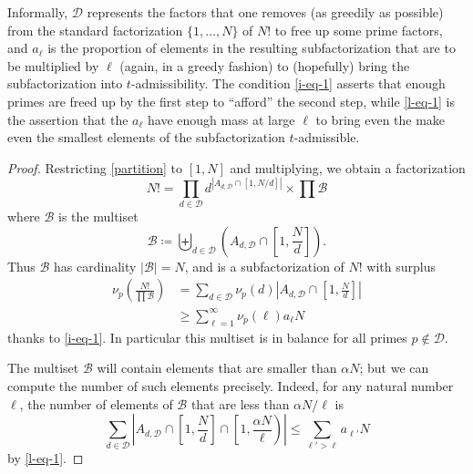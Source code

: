 \documentclass[12pt,a4paper,reqno]{amsart}
\numberwithin{equation}{section}
\theoremstyle{plain}
\theoremstyle{definition}
\newcommand\tuple{{\mathcal B}}
\begin{document}
  Informally, ${\mathcal D}$ represents the factors that one removes (as greedily as possible) from the standard factorization $\{1,\dots,N\}$ of $N!$ to free up some prime factors, and $a_\ell$ is the proportion of elements in the resulting subfactorization that are to be multiplied by $\ell$ (again, in a greedy fashion) to (hopefully) bring the subfactorization into $t$-admissibility.  The condition \eqref{i-eq-1} asserts that enough primes are freed up by the first step to ``afford'' the second step, while \eqref{l-eq-1} is the assertion that the $a_\ell$ have enough mass at large $\ell$ to bring even the make even the smallest elements of the subfactorization $t$-admissible.

  \begin{proof}  Restricting \eqref{partition} to $[1,N]$ and multiplying, we obtain a factorization
  $$ N! = \prod_{d \in {\mathcal D}} d^{|A_{d,{\mathcal D}} \cap [1,N/d]|} \times \prod \tuple$$
  where $\tuple$ is the multiset
  $$ \tuple \coloneqq \biguplus_{d \in {\mathcal D}} \left(A_{d,{\mathcal D}} \cap \left[1,\frac{N}{d}\right]\right).$$
  Thus $\tuple$ has cardinality $|\tuple| = N$, and is a subfactorization of $N!$ with surplus
  \begin{equation}\label{p-surplus-1}
  \begin{split}
   \nu_p\left( \frac{N!}{\prod \tuple} \right) &= \sum_{d \in {\mathcal D}} \nu_p(d) \left|A_{d,{\mathcal D}} \cap \left[1,\frac{N}{d}\right]\right| \\
   &\geq      \sum_{\ell=1}^\infty \nu_p(\ell) a_\ell N
  \end{split}
  \end{equation}
  thanks to \eqref{i-eq-1}.  In particular this multiset is in balance for all primes $p \not \in {\mathcal D}$. 
  
  The multiset $\tuple$ will contain elements that are smaller than $\alpha N$; but we can compute the number of such elements  precisely.  Indeed, for any natural number $\ell$, the number of elements of $\tuple$ that are less than $\alpha N/\ell$ is
  \begin{equation}\label{N-sum-1}
    \sum_{d \in {\mathcal D}} \left|A_{d,{\mathcal D}} \cap \left[1,\frac{N}{d}\right] \cap \left[1,\frac{\alpha N}{\ell}\right)\right| 
    \leq  \sum_{\ell' > \ell} a_{\ell'} N
  \end{equation}
  by \eqref{l-eq-1}.
    

\end{proof}
\end{document}
